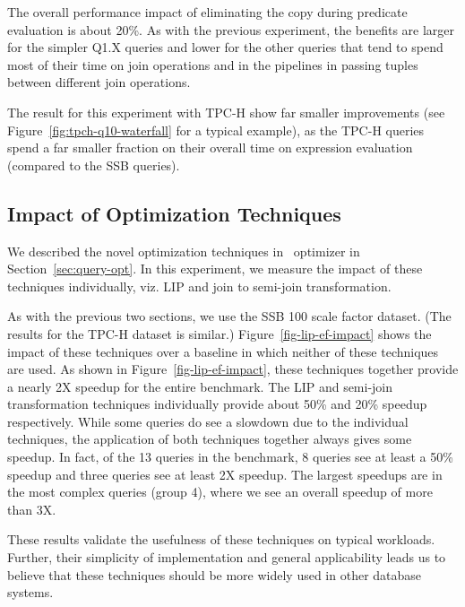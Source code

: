 The overall performance impact of eliminating the copy during predicate evaluation is about 20\%. As with the previous experiment, the benefits are larger for the simpler Q1.X queries and lower for the other queries that tend to spend most of their time on join operations and in the pipelines in passing tuples between different join operations.

The result for this experiment with TPC-H show far smaller improvements (see Figure~\ref{fig:tpch-q10-waterfall} for a typical example), as the TPC-H queries spend a far smaller fraction on their overall time on expression evaluation (compared to the SSB queries).

\subsection{Impact of Optimization Techniques}
\label{sec:expt:optimization}
We described the novel optimization techniques in \Quickstep\ optimizer in Section~\ref{sec:query-opt}. In this experiment,
we measure the impact of these techniques individually, viz. LIP and join to semi-join transformation.

As with the previous two sections, we use the SSB 100 scale factor dataset. (The results for the TPC-H dataset is similar.)
Figure~\ref{fig-lip-ef-impact} shows the impact of these techniques over a baseline in which neither of these techniques are used. As shown in Figure~\ref{fig-lip-ef-impact}, these techniques together provide a nearly 2X speedup for the entire benchmark. The LIP and semi-join transformation techniques individually provide about 50\% and 20\% speedup
respectively. While some queries do see a slowdown due to the individual techniques, the application of both
techniques together always gives some speedup. In fact, of the 13 queries in the benchmark,
8 queries see at least a 50\% speedup and three queries see at least 2X speedup. The largest speedups
are in the most complex queries (group 4), where we see an overall speedup of more than 3X.

These results validate the usefulness of these techniques on typical workloads. Further, their simplicity of implementation and general applicability leads us to believe that these techniques should be more
widely used in other database systems.


